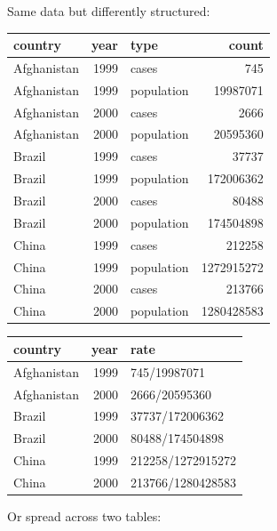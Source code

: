 \documentclass[
]{scrartcl}
\begin{document}
Same data but differently structured:

\begin{table}
\caption{\label{tab:unnamed-chunk-188} `table2` and  `table3` contain exactly the same data as  `table1`}

\begin{longtable}[t]{lrlr}
\toprule
country & year & type & count\\
\midrule
Afghanistan & 1999 & cases & 745\\
Afghanistan & 1999 & population & 19987071\\
Afghanistan & 2000 & cases & 2666\\
Afghanistan & 2000 & population & 20595360\\
Brazil & 1999 & cases & 37737\\
\addlinespace
Brazil & 1999 & population & 172006362\\
Brazil & 2000 & cases & 80488\\
Brazil & 2000 & population & 174504898\\
China & 1999 & cases & 212258\\
China & 1999 & population & 1272915272\\
\addlinespace
China & 2000 & cases & 213766\\
China & 2000 & population & 1280428583\\
\bottomrule
\end{longtable}
\begin{longtable}[t]{lrl}
\toprule
country & year & rate\\
\midrule
Afghanistan & 1999 & 745/19987071\\
Afghanistan & 2000 & 2666/20595360\\
Brazil & 1999 & 37737/172006362\\
Brazil & 2000 & 80488/174504898\\
China & 1999 & 212258/1272915272\\
\addlinespace
China & 2000 & 213766/1280428583\\
\bottomrule
\end{longtable}
\end{table}

Or spread across two tables:
\end{document}
